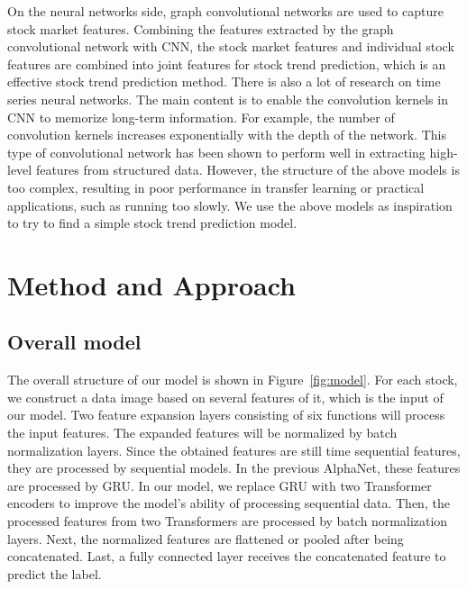 \documentclass{article}
\begin{document}
\hspace{16}On the neural networks side, graph convolutional networks are used to capture stock market features. Combining the features extracted by the graph convolutional network with CNN, the stock market features and individual stock features are combined into joint features for stock trend prediction\cite{cnn}, which is an effective stock trend prediction method. There is also a lot of research on time series neural networks. The main content is to enable the convolution kernels in CNN to memorize long-term information\cite{tcn}. For example, the number of convolution kernels increases exponentially with the depth of the network. This type of convolutional network has been shown to perform well in extracting high-level features from structured data. However, the structure of the above models is too complex, resulting in poor performance in transfer learning or practical applications, such as running too slowly. We use the above models as inspiration to try to find a simple stock trend prediction model.


\section{Method and Approach}
\subsection{Overall model}

\hspace{16}The overall structure of our model is shown in Figure~\ref{fig:model}. For each stock, we construct a data image based on several features of it, which is the input of our model. Two feature expansion layers consisting of six functions will process the input features. The expanded features will be normalized by batch normalization layers. Since the obtained features are still time sequential features, they are processed by sequential models. In the previous AlphaNet, these features are processed by GRU. In our model, we replace GRU with two Transformer encoders to improve the model's ability of processing sequential data. Then, the processed features from two Transformers are processed by batch normalization layers. Next, the normalized features are flattened or pooled after being concatenated. Last, a fully connected layer receives the concatenated feature to predict the label.
\end{document}
